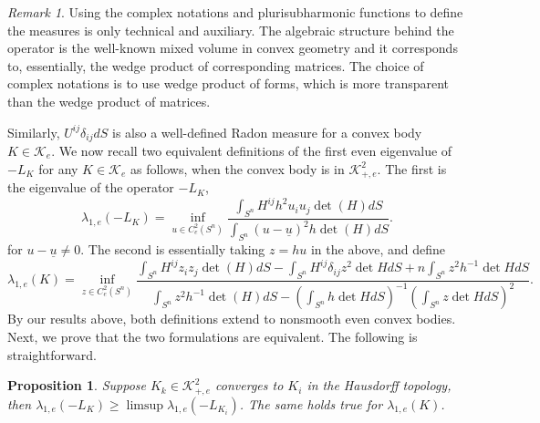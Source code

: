 \documentclass[reqno]{amsart}
\theoremstyle{remark}
\newtheorem{Remark}{Remark}[section]
\def\cK{{\mathcal K}}
\theoremstyle{plain}
\newtheorem{prop}[thm]{Proposition}
\begin{document}
\begin{Remark}
    Using the complex notations and plurisubharmonic functions to define the measures is only technical and auxiliary. The algebraic structure behind the operator is the well-known mixed volume in convex geometry  and it corresponds to, essentially, the wedge product of corresponding matrices. The choice of complex notations is to use wedge product of forms, which is more transparent than the wedge product of matrices.  
\end{Remark}


Similarly, $U^{ij}\delta_{ij}dS$ is also a well-defined Radon measure for a convex body $K\in \cK_e$. 
We  now recall two equivalent  definitions of  the first even eigenvalue of $-L_K$ for any $K\in \cK_e$ as follows, when the convex body is in $\cK^{2}_{+, e}$. The first is the eigenvalue of the operator $-L_K$, 
\begin{equation}
    \lambda_{1, e}(-L_K)=\inf_{u\in C^2_e(S^n)} \frac{\displaystyle \int_{S^n}H^{ij}h^2u_iu_j\det(H)dS}{\displaystyle\int_{S^n}{(u-\underline u)^2} h\det(H)dS}.
\end{equation}
for $u-\underline u\neq 0$. The second is essentially taking $z=hu$ in the above, and define
\begin{equation}\label{eigenvalue-003}
    \lambda_{1, e}(K)=\inf_{z\in C^2_e(S^n)}\frac{\displaystyle \int_{S^n}H^{ij}z_iz_j\det(H)dS-\int_{S^n}H^{ij}\delta_{ij}z^2 \det{H}dS+n\int_{S^n}z^2h^{-1}\det{H}dS}{\displaystyle\int_{S^n}z^2h^{-1}\det(H)dS-\left(\int_{S^n}h\det{H}dS\right)^{-1}\left(\int_{S^n}z\det{H}dS\right)^2}.
\end{equation}
By our results above, both definitions extend to nonsmooth even convex bodies. Next, we prove that the two formulations are equivalent. 
The following is straightforward.
\begin{prop}
    Suppose $K_k\in \cK^2_{+, e}$ converges to $K_i$ in the Hausdorff topology, then $\lambda_{1, e}(-L_K)\geq \limsup \lambda_{1, e}(-L_{K_i})$. The same holds true for $\lambda_{1, e}(K)$.
\end{prop}
\end{document}
